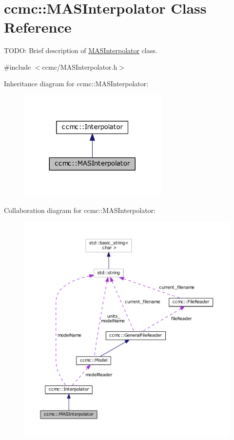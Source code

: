 \hypertarget{classccmc_1_1_m_a_s_interpolator}{\section{ccmc\-:\-:M\-A\-S\-Interpolator Class Reference}
\label{classccmc_1_1_m_a_s_interpolator}
}


T\-O\-D\-O\-: Brief description of \hyperlink{classccmc_1_1_m_a_s_interpolator}{M\-A\-S\-Interpolator} class.  




{\ttfamily \#include $<$ccmc/\-M\-A\-S\-Interpolator.\-h$>$}



Inheritance diagram for ccmc\-:\-:M\-A\-S\-Interpolator\-:\nopagebreak
\begin{figure}[H]
\begin{center}
\leavevmode
\includegraphics[width=212pt]{classccmc_1_1_m_a_s_interpolator__inherit__graph}
\end{center}
\end{figure}


Collaboration diagram for ccmc\-:\-:M\-A\-S\-Interpolator\-:\nopagebreak
\begin{figure}[H]
\begin{center}
\leavevmode
\includegraphics[width=350pt]{classccmc_1_1_m_a_s_interpolator__coll__graph}
\end{center}
\end{figure}
